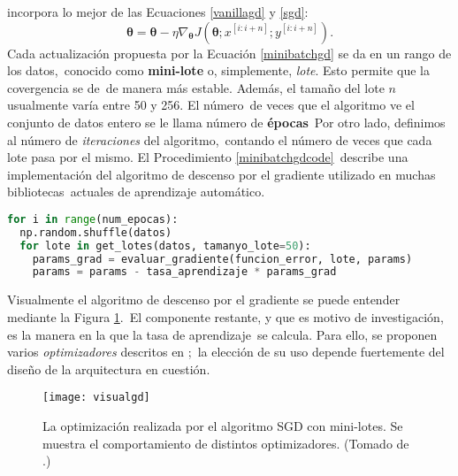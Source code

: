 incorpora lo mejor de las Ecuaciones \ref{vanillagd} y \ref{sgd}:
\begin{equation}
  \bm{\theta} = \bm{\theta} - \eta \nabla_{\bm{\theta}}J(\bm{\theta}; x^{[i:i+n]}; y^{[i:i+n]}). \label{minibatchgd}
\end{equation}
Cada actualización propuesta por la Ecuación \ref{minibatchgd} se da en un rango de los datos,\
conocido como \textbf{mini-lote} o, simplemente, \emph{lote}. Esto permite que la covergencia se de\
de manera más estable. Además, el tamaño del lote $n$ usualmente varía entre 50 y 256. El número\
de veces que el algoritmo ve el conjunto de datos entero se le llama número de \textbf{épocas}\
Por otro lado, definimos al número de \emph{iteraciones} del algoritmo,\
contando el número de veces que cada lote pasa por el mismo. El Procedimiento \ref{minibatchgdcode}\
describe una implementación del algoritmo de descenso por el gradiente utilizado en muchas bibliotecas\
actuales de aprendizaje automático.
\begin{lstlisting}[language=Python,
    caption={
      Implementación del algoritmo de descenso por el gradiente utilizando mini-lotes, en lenguaje
      Python. Antes de iterar sobre todos los lotes, se mezclan los datos de manera aleatoria.
    },
   label=minibatchgdcode
  ]
  for i in range(num_epocas):
  np.random.shuffle(datos)
  for lote in get_lotes(datos, tamanyo_lote=50):
    params_grad = evaluar_gradiente(funcion_error, lote, params)
    params = params - tasa_aprendizaje * params_grad
\end{lstlisting}\par
Visualmente el algoritmo de descenso por el gradiente se puede entender mediante la Figura \ref{visualgd}.\
El componente restante, y que es motivo de investigación, es la manera en la que la tasa de aprendizaje\
se calcula. Para ello, se proponen varios \emph{optimizadores} descritos en \cite{DBLP:journals/corr/Ruder16};\
la elección de su uso depende fuertemente del diseño de la arquitectura en cuestión.

\begin{figure}[H]
  \centering
  \texttt{[image: visualgd]}
  \caption{
    La optimización realizada por el algoritmo SGD con mini-lotes. Se muestra
    el comportamiento de distintos optimizadores.
    (Tomado de \cite{DBLP:journals/corr/Ruder16}.)
  }
  \label{visualgd}
\end{figure}
